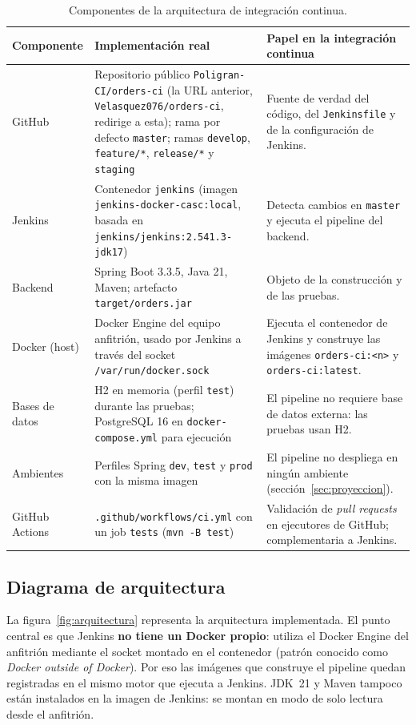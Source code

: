 \documentclass[11pt,a4paper]{article}
\begin{document}
\begin{table}[H]
\centering
\small
\begin{tabularx}{\textwidth}{@{}l L L@{}}
\toprule
\textbf{Componente} & \textbf{Implementación real} & \textbf{Papel en la integración continua}\\
\midrule
GitHub & Repositorio público \texttt{Poligran-CI/orders-ci} (la URL anterior,
\texttt{Velasquez076/orders-ci}, redirige a esta); rama por defecto \texttt{master};
ramas \texttt{develop}, \texttt{feature/*}, \texttt{release/*} y \texttt{staging} &
Fuente de verdad del código, del \texttt{Jenkinsfile} y de la configuración de Jenkins.\\
Jenkins & Contenedor \texttt{jenkins} (imagen \texttt{jenkins-docker-casc:local}, basada en
\texttt{jenkins/jenkins:2.541.3-jdk17}) & Detecta cambios en \texttt{master} y ejecuta el
pipeline del backend.\\
Backend & Spring Boot 3.3.5, Java 21, Maven; artefacto \texttt{target/orders.jar} &
Objeto de la construcción y de las pruebas.\\
Docker (host) & Docker Engine del equipo anfitrión, usado por Jenkins a través del socket
\texttt{/var/run/docker.sock} & Ejecuta el contenedor de Jenkins y construye las imágenes
\texttt{orders-ci:<n>} y \texttt{orders-ci:latest}.\\
Bases de datos & H2 en memoria (perfil \texttt{test}) durante las pruebas; PostgreSQL 16 en
\texttt{docker-compose.yml} para ejecución & El pipeline no requiere base de datos externa: las
pruebas usan H2.\\
Ambientes & Perfiles Spring \texttt{dev}, \texttt{test} y \texttt{prod} con la misma imagen &
El pipeline no despliega en ningún ambiente (sección~\ref{sec:proyeccion}).\\
GitHub Actions & \texttt{.github/workflows/ci.yml} con un job \texttt{tests} (\texttt{mvn -B test}) &
Validación de \emph{pull requests} en ejecutores de GitHub; complementaria a Jenkins.\\
\bottomrule
\end{tabularx}
\caption{Componentes de la arquitectura de integración continua.}
\label{tab:componentes-ci}
\end{table}

\subsection{Diagrama de arquitectura}

La figura~\ref{fig:arquitectura} representa la arquitectura implementada. El punto central es que
Jenkins \textbf{no tiene un Docker propio}: utiliza el Docker Engine del anfitrión mediante el socket
montado en el contenedor (patrón conocido como \emph{Docker outside of Docker}). Por eso las imágenes
que construye el pipeline quedan registradas en el mismo motor que ejecuta a Jenkins. JDK~21 y
Maven tampoco están instalados en la imagen de Jenkins: se montan en modo de solo lectura desde el
anfitrión.
\end{document}
